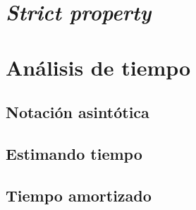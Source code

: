\section{\textit{Strict property}}



\section{Análisis de tiempo}

\subsection{Notación asintótica}

\subsection{Estimando tiempo}

\subsection{Tiempo amortizado}
